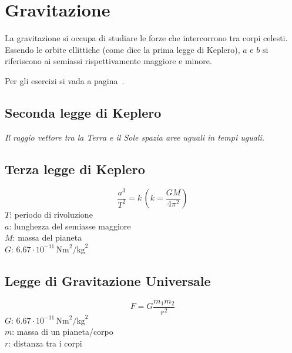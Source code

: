 
\section{Gravitazione}\label{sec:gravitazione}
La gravitazione si occupa di studiare le forze che intercorrono tra corpi celesti.\\ 
Essendo le orbite ellittiche (come dice la prima legge di Keplero), $a$ e $b$ si riferiscono ai 
semiassi rispettivamente maggiore e minore.
\begin{center}
\end{center}
Per gli esercizi si vada a pagina~\pageref{ex:gravitazione}.

\subsection{Seconda legge di Keplero}
\textit{Il raggio vettore tra la Terra e il Sole spazia aree uguali in tempi uguali.}

\subsection{Terza legge di Keplero}
\begin{equation*}
\frac{a^3}{T^2} = k\,\left(k = \frac{GM}{4\pi^2}\right)
\end{equation*}
$T$: periodo di rivoluzione\\
$a$: lunghezza del semiasse maggiore\\
$M$: massa del pianeta\\
\hyperref[tab:G]{$G$}: $6.67\cdot10^{-11}\,\text{Nm}^2\text{/kg}^2$

\subsection{Legge di Gravitazione Universale}
\begin{equation*}
F = G\frac{m_1m_2}{r^2}
\end{equation*}
\hyperref[tab:g]{$G$}: $6.67\cdot10^{-11}\,\text{Nm}^2\text{/kg}^2$\\
$m$: massa di un pianeta/corpo\\
$r$: distanza tra i corpi


